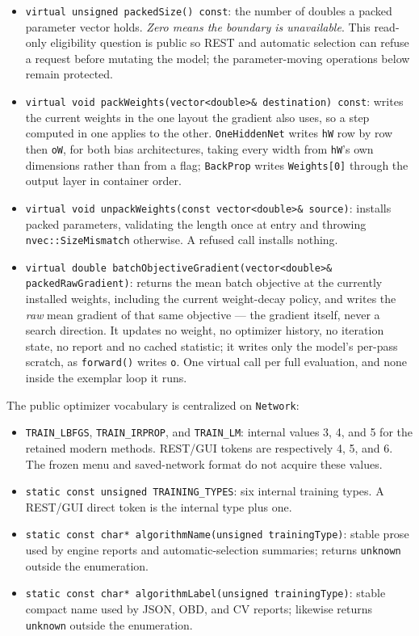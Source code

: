 \begin{itemize}
\item \texttt{virtual unsigned packedSize() const}: the number of doubles a
      packed parameter vector holds.  \emph{Zero means the boundary is
      unavailable}. This read-only eligibility question is public so REST and
      automatic selection can refuse a request before mutating the model; the
      parameter-moving operations below remain protected.
\item \texttt{virtual void packWeights(vector<double>\& destination) const}:
      writes the current weights in the one layout the gradient also uses, so a
      step computed in one applies to the other.  \texttt{OneHiddenNet} writes
      \texttt{hW} row by row then \texttt{oW}, for both bias architectures,
      taking every width from \texttt{hW}'s own dimensions rather than from a
      flag; \texttt{BackProp} writes \texttt{Weights[0]} through the output
      layer in container order.
\item \texttt{virtual void unpackWeights(const vector<double>\& source)}:
      installs packed parameters, validating the length once at entry and
      throwing \texttt{nvec::SizeMismatch} otherwise.  A refused call installs
      nothing.
\item \texttt{virtual double batchObjectiveGradient(vector<double>\&
      packedRawGradient)}: returns the mean batch objective at the currently
      installed weights, including the current weight-decay policy, and writes
      the \emph{raw} mean gradient of that same objective --- the gradient
      itself, never a search direction.  It updates no weight, no optimizer
      history, no iteration state, no report and no cached statistic; it writes
      only the model's per-pass scratch, as \texttt{forward()} writes
      \texttt{o}.  One virtual call per full evaluation, and none inside the
      exemplar loop it runs.
\end{itemize}

The public optimizer vocabulary is centralized on \texttt{Network}:

\begin{itemize}
\item \texttt{TRAIN\_LBFGS}, \texttt{TRAIN\_IRPROP}, and
      \texttt{TRAIN\_LM}: internal values 3, 4, and 5 for the retained modern
      methods. REST/GUI tokens are respectively 4, 5, and 6. The frozen menu
      and saved-network format do not acquire these values.
\item \texttt{static const unsigned TRAINING\_TYPES}: six internal training
      types. A REST/GUI direct token is the internal type plus one.
\item \texttt{static const char* algorithmName(unsigned trainingType)}: stable
      prose used by engine reports and automatic-selection summaries; returns
      \texttt{unknown} outside the enumeration.
\item \texttt{static const char* algorithmLabel(unsigned trainingType)}: stable
      compact name used by JSON, OBD, and CV reports; likewise returns
      \texttt{unknown} outside the enumeration.
\end{itemize}


